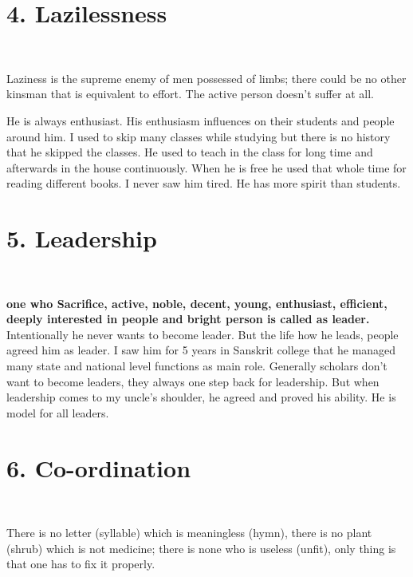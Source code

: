 \section*{4. Lazilessness }
\begin{center}
{\fontsize{15}{17}\selectfont
{}\\
}
\end{center}
Laziness is the supreme enemy of men possessed of limbs; there could be no other kinsman that is equivalent to effort. The active person doesn’t suffer at all.

He is always enthusiast. His enthusiasm influences on their students and people around him. I used to skip many classes while studying but there is no history that he skipped the classes. He used to teach in the class for long time and afterwards in the house continuously. When he is free he used that whole time for reading different books. I never saw him tired. He has more spirit than students.

\section*{5. Leadership }
\begin{center}
{\fontsize{15}{17}\selectfont
{}\\
}
\end{center}
\textbf{one who Sacrifice, active, noble, decent, young, enthusiast, efficient, deeply interested in people and bright person is called as leader.}
Intentionally he never wants to become leader. But the life how he leads, people agreed him as leader. I saw him for 5 years in Sanskrit college that he managed many state and national level functions as main role. Generally scholars don’t want to become leaders, they always one step back for leadership. But when leadership comes to my uncle’s shoulder, he agreed and proved his ability. He is model for all leaders.

\section*{6. Co-ordination }
\begin{center}
{\fontsize{15}{17}\selectfont
{}\\
}
\end{center}
There is no letter (syllable) which is meaningless (hymn), there is no plant (shrub) which is not medicine; there is none who is useless (unfit), only thing is that one has to fix it properly.

